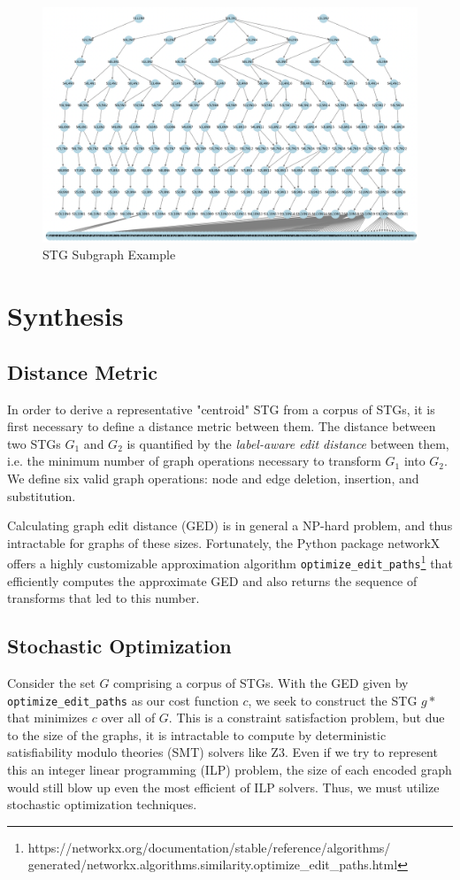 \documentclass{article}
\begin{document}
\begin{figure}[h!]
  \centering
  \includegraphics[width=\linewidth]{figs/stg_full}
  \caption{STG Subgraph Example}
  \label{fig:stg_full}
\end{figure}

\section{Synthesis}\label{sec:synthesis}
\subsection{Distance Metric}\label{subsec:dist_metric}
In order to derive a representative "centroid" STG from a corpus of STGs, it is first necessary to define a distance metric between them. The distance between two STGs $G_1$ and $G_2$ is quantified by the \textit{label-aware edit distance} between them, i.e. the minimum number of graph operations necessary to transform $G_1$ into $G_2$. We define six valid graph operations: node and edge deletion, insertion, and substitution. 

Calculating graph edit distance (GED) is in general a NP-hard problem, and thus intractable for graphs of these sizes. Fortunately, the Python package networkX offers a highly customizable approximation algorithm \verb!optimize_edit_paths!\footnote{https://networkx.org/documentation/stable/reference/algorithms/ generated/networkx.algorithms.similarity.optimize\_edit\_paths.html} that efficiently computes the approximate GED and also returns the sequence of transforms that led to this number. 

\subsection{Stochastic Optimization}\label{subsec:stoch_opt}
Consider the set $G$ comprising a corpus of STGs. With the GED given by \verb!optimize_edit_paths! as our cost function $c$, we seek to construct the STG $g*$ that minimizes $c$ over all of $G$. This is a constraint satisfaction problem, but due to the size of the graphs, it is intractable to compute by deterministic satisfiability modulo theories (SMT) solvers like Z3. Even if we try to represent this an integer linear programming (ILP) problem, the size of each encoded graph would still blow up even the most efficient of ILP solvers. Thus, we must utilize stochastic optimization techniques. 
\end{document}
